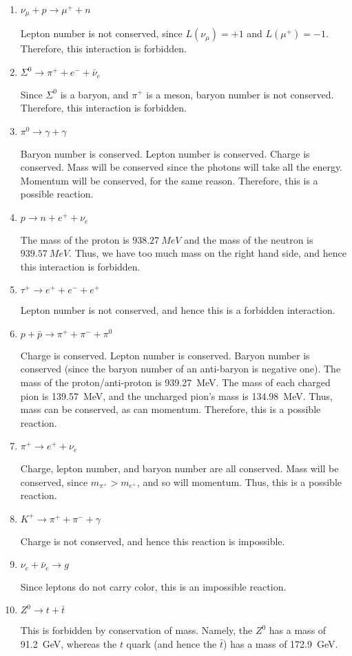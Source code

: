 \begin{enumerate}
	\item $\nu_\mu + p \to \mu^+ + n$
	
	Lepton number is not conserved, since $L(\nu_\mu) = +1$ and $L(\mu^+) = -1$. Therefore, this interaction is forbidden.
	\item $\Sigma^0 \to \pi^+ + e^- + \bar{\nu}_e$
	
	Since $\Sigma^0$ is a baryon, and $\pi^+$ is a meson, baryon number is not conserved. Therefore, this interaction is forbidden.
	\item $\pi^0\to \gamma + \gamma$
	
	Baryon number is conserved. Lepton number is conserved. Charge is conserved. Mass will be conserved since the photons will take all the energy. Momentum will be conserved, for the same reason. Therefore, this is a possible reaction.
	\item $p\to n + e^+ + \nu_e$
	
	The mass of the proton is $\SI{938.27}{MeV}$ and the mass of the neutron is $\SI{939.57}{MeV}$. Thus, we have too much mass on the right hand side, and hence this interaction is forbidden.
	\item $\tau^+ \to e^+ + e^- + e^+$
	
	Lepton number is not conserved, and hence this is a forbidden interaction.
	\item $p + \bar{p} \to \pi^+ + \pi^- + \pi^0$
	
	Charge is conserved. Lepton number is conserved. Baryon number is conserved (since the baryon number of an anti-baryon is negative one). The mass of the proton/anti-proton is \SI{939.27}{MeV}. The mass of each charged pion is \SI{139.57}{MeV}, and the uncharged pion's mass is \SI{134.98}{MeV}. Thus, mass can be conserved, as can momentum. Therefore, this is a possible reaction.
	\item $\pi^+ \to e^+ + \nu_e$
	
	Charge, lepton number, and baryon number are all conserved. Mass will be conserved, since $m_{\pi^+} > m_{e^+}$, and so will momentum. Thus, this is a possible reaction. 
	\item $K^+ \to \pi^+ + \pi^- + \gamma$
	
	Charge is not conserved, and hence this reaction is impossible. 
	\item $\nu_e + \bar{\nu}_e \to g$
	
	Since leptons do not carry color, this is an impossible reaction.
	\item $Z^0 \to t + \bar{t}$
	
	This is forbidden by conservation of mass. Namely, the $Z^0$ has a mass of \SI{91.2}{GeV}, whereas the $t$ quark (and hence the $\bar{t}$) has a mass of \SI{172.9}{GeV}.
\end{enumerate}